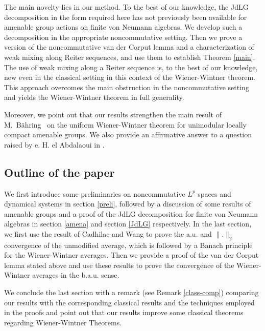 \documentclass[11pt]{amsart}
\theoremstyle{definition}
\theoremstyle{myremark}
\numberwithin{equation}{section}
\begin{document}
The main novelty lies in our method. To the best of our knowledge, the JdLG decomposition in the form required here has not previously been available for amenable group actions on finite von Neumann algebras. We develop such a decomposition in the appropriate noncommutative setting. Then we prove a version of the noncommutative van der Corput lemma and a characterization of weak mixing along Reiter sequences, and use them to establish Theorem \ref{main}. The use of weak mixing along a Reiter sequence is, to the best of our knowledge, new even in the classical setting in this context of the Wiener-Wintner theorem. This approach overcomes the main obstruction in the noncommutative setting and yields the Wiener-Wintner theorem in full generality. 

Moreover, we point out that our results strengthen the main result of M.~B\"ahring~\cite{Bahring2019} on the uniform Wiener-Wintner theorem for unimodular locally compact amenable groups. We also provide an affirmative answer to a question raised by e. H. el Abdalaoui in \cite[Question 2.12]{ElAbdalaoui2021}.

\subsection{Outline of the paper}We first introduce some preliminaries on noncommutative $L^{p}$ spaces and dynamical systems in section \ref{preli}, followed by a discussion of some results of amenable groups and a proof of the JdLG decomposition for finite von Neumann algebras in section \ref{amena}  and section \ref{JdLG} respectively. In the last section, we first use the result of Cadhilac and Wang \cite{cadilhac2022noncommutative} to prove the a.u. and $\|.\|_{2}$ convergence of the unmodified average, which is followed by a Banach principle for the Wiener-Wintner averages. Then we provide a proof of the van der Corput lemma stated above and use these results to prove the convergence of the Wiener-Wintner averages in the b.a.u. sense. 



We conclude the last section with a remark (see Remark \ref{class-comp}) comparing our results with the corresponding classical results and the techniques employed in the proofs and point out that our results improve some classical theorems regarding Wiener-Wintner Theorems. 
\end{document}

